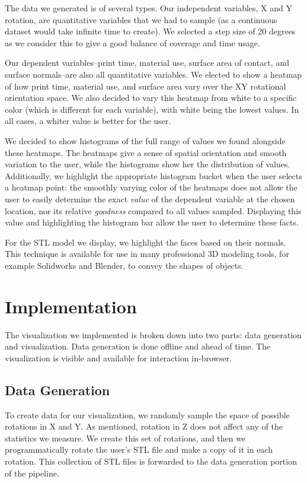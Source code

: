 \documentclass{sigchi}
\begin{document}
The data we generated is of several types.  Our independent variables, X and Y rotation, are quantitative variables that we had to sample (as a continuous dataset would take infinite time to create).  We selected a step size of 20 degrees as we consider this to give a good balance of coverage and time usage.

Our dependent variables--print time, material use, surface area of contact, and surface normals--are also all quantitative variables.  We elected to show a heatmap of how print time, material use, and surface area vary over the XY rotational orientation space.  We also decided to vary this heatmap from white to a specific color (which is different for each variable), with white being the lowest values.  In all cases, a whiter value is better for the user.

We decided to show histograms of the full range of values we found alongside these heatmaps.  The heatmaps give a sense of spatial orientation and smooth variation to the user, while the histograms show her the distribution of values.  Additionally, we highlight the appropriate histogram bucket when the user selects a heatmap point: the smoothly varying color of the heatmaps does not allow the user to easily determine the exact \emph{value} of the dependent variable at the chosen location, nor its relative \emph{goodness} compared to all values sampled.  Displaying this value and highlighting the histogram bar allow the user to determine these facts.

For the STL model we display, we highlight the faces based on their normals.  This technique is available for use in many professional 3D modeling tools, for example Solidworks and Blender, to convey the shapes of objects.

\section{Implementation}
The visualization we implemented is broken down into two parts: data generation and visualization.  Data generation is done offline and ahead of time.  The visualization is visible and available for interaction in-browser.

\subsection{Data Generation}
To create data for our visualization, we randomly sample the space of possible rotations in X and Y.  As mentioned, rotation in Z does not affect any of the statistics we measure.  We create this set of rotations, and then we programmatically rotate the user's STL file and make a copy of it in each rotation.  This collection of STL files is forwarded to the data generation portion of the pipeline.
\end{document}
